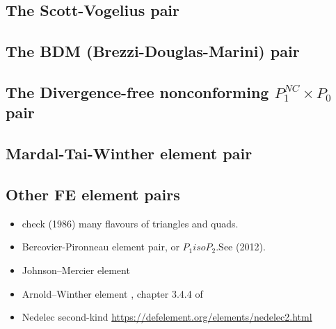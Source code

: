 \newpage
\subsection{The Scott-Vogelius pair} \label{ss:scott_vogelius}


\subsection{The BDM (Brezzi-Douglas-Marini) pair} \label{ss:bdm}


\subsection{The Divergence-free nonconforming ${ P}_1^{NC}\times P_0$ pair} \label{ss:p1ncp0}



\subsection{Mardal-Tai-Winther element pair} \label{ss:pairmtw}




\subsection{Other FE element pairs}

\begin{itemize}

\item check \textcite{dhhu86} (1986) many flavours of triangles and quads.

\item Bercovier-Pironneau element pair, or $P_1isoP_2$.See \textcite{bocg12} (2012).

\item Johnson–Mercier element \cite{aubb17}

\item Arnold–Winther element \cite{aubb17}, chapter 3.4.4 of \cite{lomw12}

\item Nedelec second-kind \url{https://defelement.org/elements/nedelec2.html} \cite{nede86}

\end{itemize}



